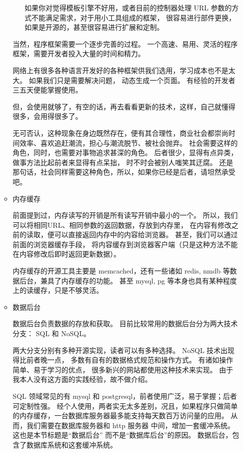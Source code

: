 \documentclass{article}
\begin{document}
\begin{itemize}
\begin{itemize}
\begin{itemize}
        如果你对觉得模板引擎不好用，或者目前的控制器处理 URL 参数的方式不能满足需求，对于用小工具组成的框架，
        很容易进行部件更换，如果是开源的，甚至很容易进行扩展和定制。
        
      \end{itemize}

      当然，程序框架需要一个逐步完善的过程。 一个高速、易用、灵活的程序框架，需要开发者投入大量的时间和精力。

      网络上有很多各种语言开发好的各种框架供我们选用，学习成本也不是太大。 如果我们只是需要解决问题，
      动态生成一个页面。 有经验的开发者三五天便能掌握使用。

      但，会使用就够了，有空的话，再去看看更新的技术，这样，自己就懂得很多，会用得很多了。

      无可否认，这种现象在身边既然存在，便有其合理性，商业社会都崇尚时间效率、喜欢追赶潮流，担心与潮流脱节、被社会抛弃。
      社会需要这样的角色，同时，也需要对事物追求甚深的角色。 后者很少，显得有点异类，做事方法比起前者来显得有点呆拙，
      时不时会被别人嗤笑其迂腐。 还是那句话，社会同样需要这种角色，所以，如果你已经是后者，请坦然承受吧。

    \item 内存缓存

      前面提到过，内存读写的开销是所有读写开销中最小的一个。 所以，我们可以将相同URL、相同参数的返回数据，存放到内存里，
      在内容有修改之前的读取，便可以直接返回内存中的内容给浏览器。 甚至，我们可以通过前面的浏览器缓存手段，
      将内容缓存到浏览器客户端（只是这种方法不能在内容修改后即时返回更新数据）。

      内存缓存的开源工具主要是 memcached，还有一些诸如 redis, nmdb 等数据后台，兼具了内存缓存的功能。
      甚至 mysql, pg 等本身也具有某种程度上的读缓存，只是不够灵活。
      
    \item 数据后台

      数据后台负责数据的存放和获取。 目前比较常用的数据后台分为两大技术分支： SQL 和 NoSQL。

      两大分支分别有多种开源实现，读者可以有多种选择。 NoSQL 技术出现得比前者晚一点，
      多数有自有的数据格式规范和操作方式。 有诸如操作简单、易于学习的优点，
      很多新兴的网站都使用这种技术来实现。 由于我本人没有这方面的实践经验，故不做介绍。

      SQL 领域常见的有 mysql 和 postgresql，前者使用广泛，易于掌握；后者可定制性强。
      经个人使用，两者实无太多差别，况且，如果程序只做简单的内存缓存，一台数据库服务器最多能支持每天数百万访问量的应用。
      从而，我们需要在数据库服务器和 http 服务器 中间，增加一套缓冲系统。
      这也是本节标题是“数据后台” 而不是“数据库后台”的原因。 数据后台，包含了数据库系统和这套缓冲系统。


\end{itemize}
\end{itemize}
\end{document}
